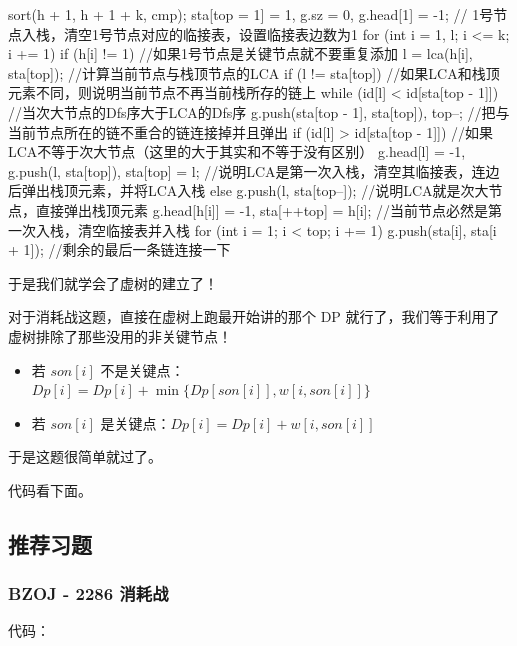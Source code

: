 \begin{cppcode}
sort(h + 1, h + 1 + k, cmp);
sta[top = 1] = 1, g.sz = 0, g.head[1] = -1;
// 1号节点入栈，清空1号节点对应的临接表，设置临接表边数为1
for (int i = 1, l; i <= k; i += 1)
  if (h[i] != 1)  //如果1号节点是关键节点就不要重复添加
  {
    l = lca(h[i], sta[top]);  //计算当前节点与栈顶节点的LCA
    if (l !=
        sta[top])  //如果LCA和栈顶元素不同，则说明当前节点不再当前栈所存的链上
    {
      while (id[l] < id[sta[top - 1]])  //当次大节点的Dfs序大于LCA的Dfs序
        g.push(sta[top - 1], sta[top]),
            top--;  //把与当前节点所在的链不重合的链连接掉并且弹出
      if (id[l] >
          id[sta[top -
                 1]])  //如果LCA不等于次大节点（这里的大于其实和不等于没有区别）
        g.head[l] = -1, g.push(l, sta[top]), sta[top] = l;
      //说明LCA是第一次入栈，清空其临接表，连边后弹出栈顶元素，并将LCA入栈
      else
        g.push(l, sta[top--]);  //说明LCA就是次大节点，直接弹出栈顶元素
    }
    g.head[h[i]] = -1,
    sta[++top] = h[i];  //当前节点必然是第一次入栈，清空临接表并入栈
  }
for (int i = 1; i < top; i += 1)
  g.push(sta[i], sta[i + 1]);  //剩余的最后一条链连接一下
\end{cppcode}

于是我们就学会了虚树的建立了！

对于消耗战这题，直接在虚树上跑最开始讲的那个 DP 就行了，我们等于利用了虚树排除了那些没用的非关键节点！

\begin{itemize}
\item 若 $son[i]$ 不是关键点：$Dp[i]=Dp[i] + \min \{Dp[son[i]],w[i,son[i]]\}$
\item 若 $son[i]$ 是关键点：$Dp[i]=Dp[i] + w[i,son[i]]$
\end{itemize}

于是这题很简单就过了。

代码看下面。

\subsection{推荐习题}

\subsubsection{BZOJ - 2286 消耗战}

代码：

